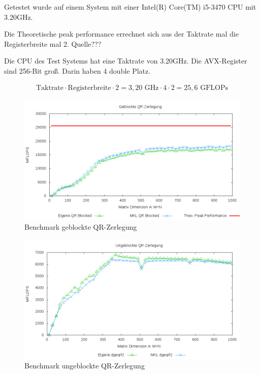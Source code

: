 Getestet wurde auf einem System mit einer Intel(R) Core(TM) i5-3470 CPU mit 3.20GHz. 

Die Theoretische peak performance errechnet sich aus der Taktrate mal die Registerbreite mal 2. Quelle???


Die CPU des Test Systems hat eine Taktrate von 3.20GHz.
Die AVX-Register sind 256-Bit groß. Darin haben 4 double Platz.

\begin{align*}
	\text{Taktrate} \cdot \text{Registerbreite} \cdot 2= 3,20 \text{ GHz} \cdot 4 \cdot 2 = 25,6 \text{ GFLOPs}
\end{align*}

\begin{figure}[H]
	\includegraphics[width=\textwidth]{images/blk.png}
	\caption{Benchmark geblockte QR-Zerlegung}
	\label{img:blk}
\end{figure}

\begin{figure}[H]
	\includegraphics[width=\textwidth]{images/unblk.png}
	\caption{Benchmark ungeblockte QR-Zerlegung}
	\label{img:unblk}
\end{figure}








	 
